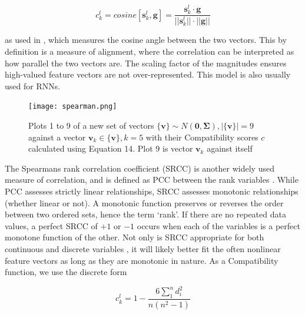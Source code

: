 \documentclass[11pt]{article}
\begin{document}
\begin{equation}
c^{l}_{k} = cosine[\bm{s}^{l}_{k}, \bm{g}] = \frac{\bm{s}^{l}_{k} \cdot \bm{g}}{||\bm{s}^{l}_{k}|| \cdot ||\bm{g}||}
\end{equation}

as used in \cite{graves}, which measures the cosine angle between the two vectors. This by definition is a measure of alignment, where the correlation can be interpreted as how parallel the two vectors are. The scaling factor of the magnitudes ensures high-valued feature vectors are not over-represented. This model is also usually used for RNNs. \newline

\begin{figure}[htp]
    \centering
    \texttt{[image: spearman.png]}
    \caption{Plots 1 to 9 of a new set of vectors $\{\bm{v}\} \sim N(\bm{0}, \bm{\Sigma}), |\{\bm{v}\}| = 9$ against a vector $\bm{v}_k \in \{\bm{v}\}, k=5$ with their Compatibility scores $c$ calculated using Equation 14. Plot 9 is vector $\bm{v}_k$ against itself}
 \end{figure}
 
The Spearmans rank correlation coefficient (SRCC) is another widely used measure of correlation, and is defined as PCC between the rank variables \cite{myers}. While PCC assesses strictly linear relationships, SRCC assesses monotonic relationships (whether linear or not). A monotonic function preserves or reverses the order between two ordered sets, hence the term `rank'. If there are no repeated data values, a perfect SRCC of $+1$ or $-1$ occurs when each of the variables is a perfect monotone function of the other. Not only is SRCC appropriate for both continuous and discrete variables \cite{lehman}, it will likely better fit the often nonlinear feature vectors as long as they are monotonic in nature. As a Compatibility function, we use the discrete form 
 
\begin{equation}
c^{l}_{k} = 1 - \frac{6\sum^{n}_1 d_{i}^{2}}{n(n^{2}-1)}
\end{equation}
\end{document}
